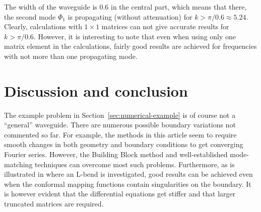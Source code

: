 \documentclass[numreferences]{kluwer}
\renewcommand{\Phi}{\varPhi}
\renewcommand{\Re}{\operatorname{Re}}
\renewcommand{\Phi}{\varPhi}
\begin{document}
The width of the waveguide is $0.6$ in the central part, which means
that there, the second mode $\Phi_1$ is propagating (without
attenuation) for $k>\pi/0.6\approx5.24$. Clearly, calculations with
$1\times1$ matrices can not give accurate results for $k>\pi/0.6$.
However, it is interesting to note that even when using only one
matrix element in the calculations, fairly good results are achieved
for frequencies with not more than one propagating mode.









\section{Discussion and conclusion}
\label{sec:conclusion}

The example problem in Section~\ref{sec:numerical-example} is of
course not a ``general'' wave\-guide. There are numerous possible
boundary variations not commented so far. For example, the methods in
this article seem to require smooth changes in both geometry and
boundary conditions to get converging Fourier series. However, the
Building Block method and well-established mode-matching techniques
can overcome most such problems. Furthermore, as is illustrated in
\cite{Nilsson:2002} where an L-bend is investigated, good results can
be achieved even when the conformal mapping functions contain
singularities on the boundary. It is however evident that the
differential equations get stiffer and that larger truncated matrices
are required.
\end{document}
